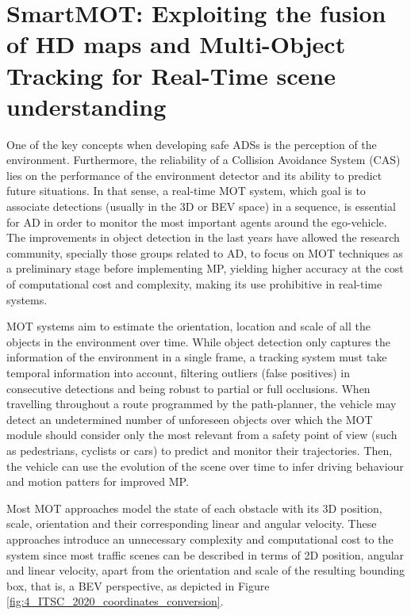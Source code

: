 \section{SmartMOT: Exploiting the fusion of HD maps and Multi-Object Tracking for Real-Time scene understanding}
\label{sec:4_smartmot}


One of the key concepts when developing safe \acp{ADS} is the perception of the environment. Furthermore, the reliability of a Collision Avoidance System (CAS) lies on the performance of the environment detector and its ability to predict future situations. In that sense, a real-time \ac{MOT} system, which goal is to associate detections (usually in the 3D or \ac{BEV} space) in a sequence, is essential for \ac{AD} in order to monitor the most important agents around the ego-vehicle. The improvements in object detection in the last years have allowed the research community, specially those groups related to \ac{AD}, to focus on \ac{MOT} techniques as a preliminary stage before implementing \ac{MP}, yielding higher accuracy at the cost of computational cost and complexity, making its use prohibitive in real-time systems. 

\ac{MOT} systems aim to estimate the orientation, location and scale of all the objects in the environment over time. While object detection only captures the information of the environment in a single frame, a tracking system must take temporal information into account, filtering outliers (\aka false positives) in consecutive detections and being robust to partial or full occlusions. When travelling throughout a route programmed by the path-planner, the vehicle may detect an undetermined number of unforeseen objects over which the \ac{MOT} module should consider only the most relevant from a safety point of view (such as pedestrians, cyclists or cars) to predict and monitor their trajectories. Then, the vehicle can use the evolution of the scene over time to infer driving behaviour and motion patters for improved \ac{MP}.

Most \ac{MOT} approaches \cite{weng20203d, chiu2021probabilistic} model the state of each obstacle with its 3D position, scale, orientation and their corresponding linear and angular velocity. These approaches introduce an unnecessary complexity and computational cost to the system since most traffic scenes can be described in terms of 2D position, angular and linear velocity, apart from the orientation and scale of the resulting bounding box, that is, a \ac{BEV} perspective, as depicted in Figure \ref{fig:4_ITSC_2020_coordinates_conversion}. 

